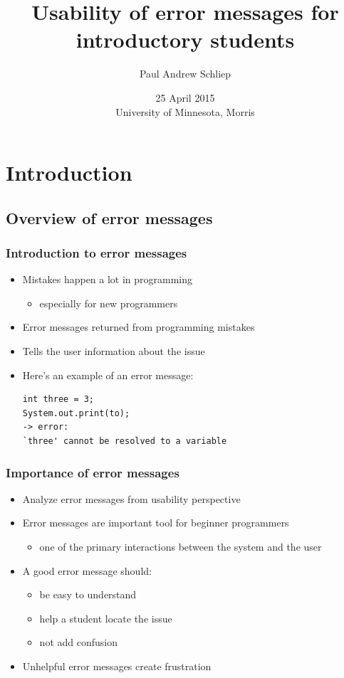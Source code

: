 \documentclass{beamer}
\title[Usability of Error Messages for Introductory Students]{Usability of error messages for \\ introductory students}
\author[Schliep]{Paul Andrew Schliep}
\institute[U of Minn, Morris]
{
  Division of Science and Mathematics \\
  University of Minnesota, Morris \\
  Morris, Minnesota, USA
}
\date[April '15] %
{25 April 2015 \\ University of Minnesota, Morris}
\begin{document}
\begin{frame}
  \titlepage
\end{frame}


\section*{Introduction}

\subsection*{Overview of error messages}

\begin{frame}[fragile]
  \frametitle{Introduction to error messages}
  \begin{itemize}
  	\item Mistakes happen a lot in programming
  	\begin{itemize}
  		\item especially for new programmers
  	\end{itemize}
  	\item Error messages returned from programming mistakes
  	\item Tells the user information about the issue
  	\item Here's an example of an error message:
  	  \begin{verbatim}
int three = 3;
System.out.print(to);
-> error: 
`three' cannot be resolved to a variable
  	\end{verbatim}
  \end{itemize}
\end{frame}

\begin{frame}
  \frametitle{Importance of error messages}
  \begin{itemize}
    \item Analyze error messages from usability perspective
  	\item Error messages are important tool for beginner programmers
  	\begin{itemize}
  		\item one of the primary interactions between the system and the user
  	\end{itemize}
  	\item A good error message should:
  	\begin{itemize}
  		\item be easy to understand
  		\item help a student locate the issue
  		\item not add confusion
  	\end{itemize}
  	\item Unhelpful error messages create frustration
  \end{itemize}
\end{frame}
\end{document}
